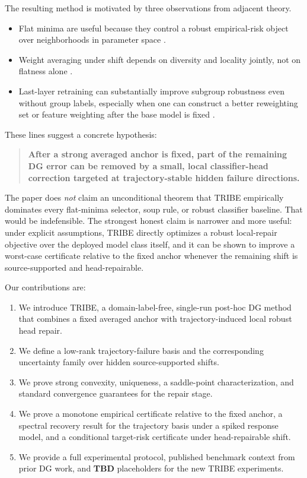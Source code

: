 \documentclass{article}
\newcommand{\TBD}{\textbf{TBD}}
\newcommand{\tribe}{\textup{\textsc{TRIBE}}}
\newcommand{\1}{\mathbbm{1}}
\begin{document}
The resulting method is motivated by three observations from adjacent theory.
\begin{itemize}[leftmargin=1.4em]
    \item Flat minima are useful because they control a robust empirical-risk object over neighborhoods in parameter space \citep{cha2021swad}.
    \item Weight averaging under shift depends on diversity and locality jointly, not on flatness alone \citep{rame2022diwa}.
    \item Last-layer retraining can substantially improve subgroup robustness even without group labels, especially when one can construct a better reweighting set or feature weighting after the base model is fixed \citep{qiu2023afr,labonte2023self,roburin2023gram}.
\end{itemize}
These lines suggest a concrete hypothesis:
\begin{quote}
\textbf{After a strong averaged anchor is fixed, part of the remaining DG error can be removed by a small, local classifier-head correction targeted at trajectory-stable hidden failure directions.}
\end{quote}

The paper does \emph{not} claim an unconditional theorem that \tribe{} empirically dominates every flat-minima selector, soup rule, or robust classifier baseline. That would be indefensible. The strongest honest claim is narrower and more useful: under explicit assumptions, \tribe{} directly optimizes a robust local-repair objective over the deployed model class itself, and it can be shown to improve a worst-case certificate relative to the fixed anchor whenever the remaining shift is source-supported and head-repairable.

Our contributions are:
\begin{enumerate}[leftmargin=1.4em]
    \item We introduce \tribe{}, a domain-label-free, single-run post-hoc DG method that combines a fixed averaged anchor with trajectory-induced local robust head repair.
    \item We define a low-rank trajectory-failure basis and the corresponding uncertainty family over hidden source-supported shifts.
    \item We prove strong convexity, uniqueness, a saddle-point characterization, and standard convergence guarantees for the repair stage.
    \item We prove a monotone empirical certificate relative to the fixed anchor, a spectral recovery result for the trajectory basis under a spiked response model, and a conditional target-risk certificate under head-repairable shift.
    \item We provide a full experimental protocol, published benchmark context from prior DG work, and \TBD{} placeholders for the new \tribe{} experiments.
\end{enumerate}
\end{document}
